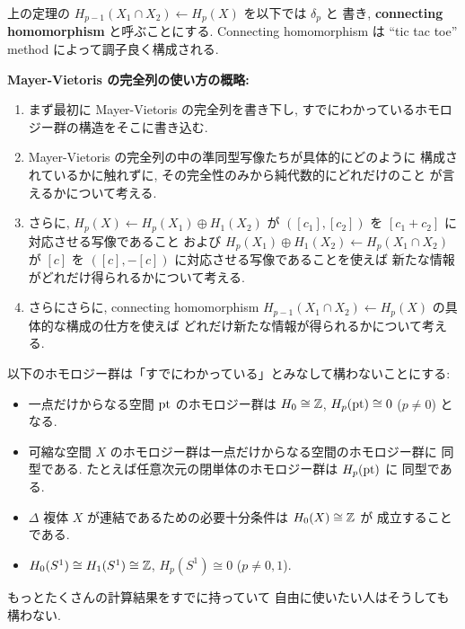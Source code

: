 \documentclass[12pt,twoside]{jarticle}
\begin{document}
上の定理の $H_{p-1}(X_1\cap X_2)\leftarrow H_p(X)$ を以下では $\delta_p$ と
書き, {\bf connecting homomorphism} と呼ぶことにする. 
Connecting homomorphism は ``tic tac toe'' method によって調子良く構成される.


\medskip\noindent
{\bf Mayer-Vietoris の完全列の使い方の概略:}
\begin{enumerate}
\item まず最初に Mayer-Vietoris の完全列を書き下し, 
  すでにわかっているホモロジー群の構造をそこに書き込む.
\item Mayer-Vietoris の完全列の中の準同型写像たちが具体的にどのように
  構成されているかに触れずに, その完全性のみから純代数的にどれだけのこと
  が言えるかについて考える.
\item さらに, $H_p(X)\leftarrow H_p(X_1)\oplus H_1(X_2)$ 
  が $([c_1],[c_2])$ を $[c_1+c_2]$ に対応させる写像であること
  および $H_p(X_1)\oplus H_1(X_2) \leftarrow H_p(X_1\cap X_2)$ 
  が $[c]$ を $([c], -[c])$ に対応させる写像であることを使えば
  新たな情報がどれだけ得られるかについて考える.
\item さらにさらに, connecting homomorphism %
  $H_{p-1}(X_1\cap X_2)\leftarrow H_p(X)$ の具体的な構成の仕方を使えば
  どれだけ新たな情報が得られるかについて考える.
\end{enumerate}

以下のホモロジー群は「すでにわかっている」とみなして構わないことにする:
\begin{itemize}
\item 一点だけからなる空間 $\mathop{\mathrm{pt}}$ のホモロジー群は $H_0\cong{\mathbb Z}$, %
  $H_p(\mathop{\mathrm{pt}})\cong 0$ ($p\ne 0$) となる.
\item 可縮な空間 $X$ のホモロジー群は一点だけからなる空間のホモロジー群に
  同型である. たとえば任意次元の閉単体のホモロジー群は $H_p(\mathop{\mathrm{pt}})$ に
  同型である.
\item $\Delta$ 複体 $X$ が連結であるための必要十分条件は $H_0(X)\cong{\mathbb Z}$ が
  成立することである.
\item $H_0(S^1)\cong H_1(S^1)\cong{\mathbb Z}$, $H_p(S^1)\cong 0$ ($p\ne 0,1$).
\end{itemize}
もっとたくさんの計算結果をすでに持っていて
自由に使いたい人はそうしても構わない.
\end{document}
